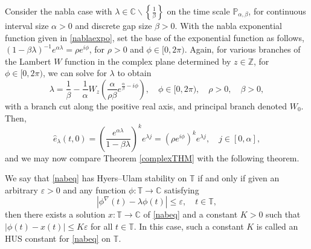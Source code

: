 \documentclass[10pt,a4paper]{amsart}
\newcommand{\C}{\ensuremath{\mathbb{C}}}
\newcommand{\T}{\ensuremath{\mathbb{T}}}
\newcommand{\Z}{\ensuremath{\mathbb{Z}}}
\newcommand{\p}{\ensuremath{\mathbb{P}}}
\begin{document}
\begin{remark}
Consider the nabla case with $\lambda\in\C\backslash\left\{\frac{1}{\beta}\right\}$ on the time scale $\p_{\alpha,\beta}$, for continuous interval size $\alpha>0$ and discrete gap size $\beta>0$. With the nabla exponential function given in \eqref{nablaexpo}, set the base of the exponential function as follows, $(1-\beta\lambda)^{-1}e^{\alpha\lambda}=\rho e^{i\phi}$, for $\rho>0$ and $\phi\in[0,2\pi)$. Again, for various branches of the Lambert $W$ function in the complex plane determined by $z\in\Z$, for $\phi\in[0,2\pi)$, we can solve for $\lambda$ to obtain
\begin{equation}\label{complexnab}
 \lambda = \frac{1}{\beta}-\frac{1}{\alpha}W_z\left(\frac{\alpha}{\rho\beta}e^{\frac{\alpha}{\beta}-i\phi}\right), \quad \phi\in[0,2\pi), \quad \rho >0, \quad \beta>0,
\end{equation} 
with a branch cut along the positive real axis, and principal branch denoted $W_0$. Then,
\begin{equation}\label{thm33eq1}
 \widehat{e}_{\lambda}(t,0)=\left(\frac{e^{\alpha\lambda}}{1-\beta\lambda}\right)^{k}e^{\lambda j}=\left(\rho e^{i\phi}\right)^{k}e^{\lambda j}, \quad j\in[0,\alpha],
\end{equation}
and we may now compare Theorem \ref{complexTHM} with the following theorem.
\end{remark}

\begin{definition}
We say that \eqref{nabeq} has Hyers--Ulam stability on $\T$ if and only if given an arbitrary $\varepsilon>0$ and any function $\phi:\T\rightarrow\C$ satisfying 
\begin{equation}\label{phiineq}
 |\phi^\nabla(t)-\lambda\phi(t)|\le\varepsilon,  \quad t\in\T, 
\end{equation}
then there exists a solution $x:\T\rightarrow\C$ of \eqref{nabeq} and a constant $K>0$ such that $|\phi(t)-x(t)|\le K\varepsilon$ for all $t\in\T$. In this case, such a constant $K$ is called an HUS constant for \eqref{nabeq} on $\T$.
\end{definition}
\end{document}
